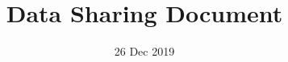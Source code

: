\documentclass{FDAdocument}
\title{Data Sharing Document}
\author{}
\date{26 Dec 2019}
\begin{document}
\renewcommand{\onlyinsubfile}[1]{}
\renewcommand{\notinsubfile}[1]{#1}






\pagebreak
\def \contentsname {Table of Contents}
\tableofcontents

\pagebreak











\end{document}
